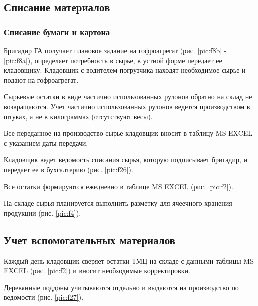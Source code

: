 \newpage
%
\subsection{Списание материалов}
\label{bp:MatOutput}

\subsubsection{Списание бумаги и картона}


Бригадир ГА получает плановое задание на гофроагрегат (рис. \ref{pic:f8b} - \ref{pic:f8a}),
определяет потребность в сырье, в устной форме передает ее кладовщику. Кладовщик с водителем погрузчика находят необходимое сырье и подают на гофроагрегат.

Сырьевые остатки в виде частично использованных рулонов обратно на склад не возвращаются. Учет частично использованных рулонов ведется производством в штуках, а не в килограммах (отсутствуют весы).

Все переданное на производство сырье кладовщик вносит в таблицу MS EXCEL с указанием даты передачи.

Кладовщик ведет ведомость списания сырья, которую подписывает бригадир, и передает ее в бухгалтерию (рис. \ref{pic:f26}).

Все остатки формируются ежедневно в таблице MS EXCEL (рис. \ref{pic:f2}).

На складе сырья планируется выполнить разметку для ячеечного хранения продукции (рис. \ref{pic:f4}). 




\subsection{Учет вспомогательных материалов}

Каждый день кладовщик сверяет остатки ТМЦ на складе с данными таблицы MS EXCEL (рис. \ref{pic:f2}) и вносит необходимые корректировки.

Деревянные поддоны учитываются отдельно и выдаются на производство по ведомости  (рис. \ref{pic:f27}).





